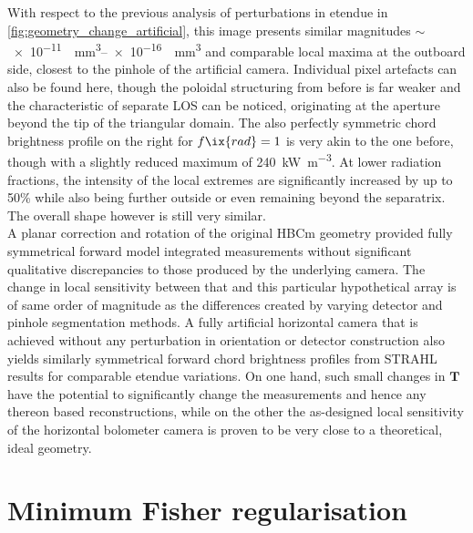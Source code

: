             With respect to the previous analysis of perturbations in etendue in \cref{fig:geometry_change_artificial}, this image presents similar magnitudes $\sim$\SIrange[per-mode=reciprocal]{e-11}{e-16}{\per\cubic\milli\meter} and comparable local maxima at the outboard side, closest to the pinhole of the artificial camera. Individual pixel artefacts can also be found here, though the poloidal structuring from before is far weaker and the characteristic of separate LOS can be noticed, originating at the aperture beyond the tip of the triangular domain. The also perfectly symmetric chord brightness profile on the right for $f\ix{rad}=1$ is very akin to the one before, though with a slightly reduced maximum of \SI{240}{\kilo\watt\per\cubic\meter}. At lower radiation fractions, the intensity of the local extremes are significantly increased by up to 50\% while also being further outside or even remaining beyond the separatrix. The overall shape however is still very similar.\\%
            A planar correction and rotation of the original HBCm geometry provided fully symmetrical forward model integrated measurements without significant qualitative discrepancies to those produced by the underlying camera. The change in local sensitivity between that and this particular hypothetical array is of same order of magnitude as the differences created by varying detector and pinhole segmentation methods. A fully artificial horizontal camera that is achieved without any perturbation in orientation or detector construction also yields similarly symmetrical forward chord brightness profiles from STRAHL results for comparable etendue variations. On one hand, such small changes in $\mathbf{T}$ have the potential to significantly change the measurements and hence any thereon based reconstructions, while on the other the as-designed local sensitivity of the horizontal bolometer camera is proven to be very close to a theoretical, ideal geometry.%
%
    \section{Minimum Fisher regularisation}\label{apx:phantom}
%
